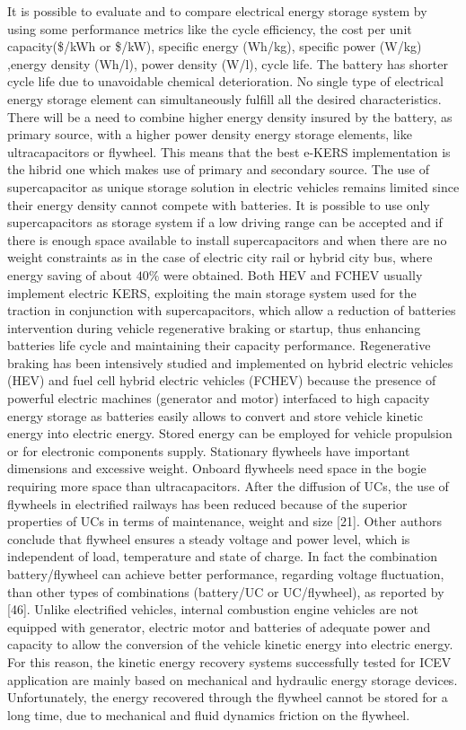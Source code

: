 \documentclass[11pt]{article}
\begin{document}
It is possible to evaluate and to compare electrical energy storage system by using some performance metrics like the cycle efficiency, the cost per unit capacity(\$/kWh or \$/kW), specific energy (Wh/kg), specific power (W/kg) ,energy density (Wh/l), power density (W/l), cycle life. The battery has shorter cycle life due to unavoidable chemical deterioration. No single type of electrical energy storage element can simultaneously fulfill all the desired characteristics. There will be a need to combine higher energy density insured by the battery, as primary source, with a higher power density energy storage elements, like ultracapacitors or flywheel. This means that the best e-KERS implementation is the hibrid one which makes use of primary and secondary source. The use of supercapacitor as unique storage solution in electric vehicles remains limited since their energy density cannot compete with batteries. It is possible to use only supercapacitors as storage system if a low driving range can be accepted and if there is enough space available to install supercapacitors and when there are no weight constraints as in the case of electric city rail or hybrid city bus, where energy saving of about $40\%$ were obtained. Both HEV  and FCHEV  usually implement electric KERS, exploiting the main storage system used for the traction in conjunction with supercapacitors, which allow a reduction of batteries intervention during vehicle regenerative braking or startup, thus enhancing batteries life cycle and maintaining their capacity performance. Regenerative braking has been intensively studied and implemented on hybrid electric vehicles (HEV) and fuel cell hybrid electric vehicles (FCHEV) because the presence of powerful electric machines (generator and motor) interfaced to high capacity energy storage as batteries easily allows to convert and store vehicle kinetic energy into electric energy. Stored energy can be employed for vehicle propulsion or for electronic components supply.  Stationary flywheels have important dimensions and excessive weight. Onboard flywheels need space in the bogie requiring more space than ultracapacitors. After the diffusion of UCs, the use of flywheels in electrified railways has been reduced because of the superior properties of UCs in terms of maintenance, weight and size [21]. Other authors conclude that flywheel ensures a steady voltage and power level, which is independent of load, temperature and state of charge. In fact the combination battery/flywheel can achieve better performance, regarding voltage fluctuation, than other types of combinations (battery/UC or UC/flywheel), as reported by [46]. Unlike electrified vehicles, internal combustion engine vehicles are not equipped with generator, electric motor and batteries of adequate power and capacity to allow the conversion of the vehicle kinetic energy into electric energy. For this reason, the kinetic energy recovery systems successfully tested for ICEV application are mainly based on mechanical and hydraulic energy storage devices. Unfortunately, the energy recovered through the flywheel cannot be stored for a long time, due to mechanical and fluid dynamics friction on the flywheel.
 
\end{document}
